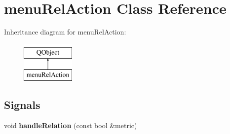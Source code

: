\hypertarget{classmenu_rel_action}{}\section{menu\+Rel\+Action Class Reference}
\label{classmenu_rel_action}
Inheritance diagram for menu\+Rel\+Action\+:\begin{figure}[H]
\begin{center}
\leavevmode
\includegraphics[height=2.000000cm]{classmenu_rel_action}
\end{center}
\end{figure}
\subsection*{Signals}
\begin{DoxyCompactItemize}
\item 
\mbox{\label{classmenu_rel_action_a7f2a2824476be1c8e185c3b6361ad62d}} 
void {\bfseries handle\+Relation} (const bool \&metric)
\end{DoxyCompactItemize}

